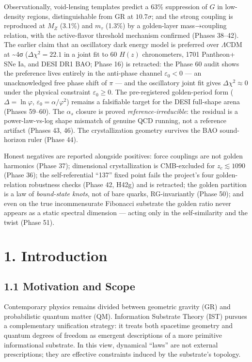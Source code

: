 \documentclass[
  11pt,
]{article}
\begin{document}
Observationally, void-lensing templates predict a 63\% suppression of
\(G\) in low-density regions, distinguishable from GR at \(10.7\sigma\);
and the strong coupling is reproduced at \(M_Z\) (3.1\%) and \(m_\tau\)
(1.3\%) by a golden-layer mass→coupling relation, with the active-flavor
threshold mechanism confirmed (Phases 38--42). The earlier claim that an
oscillatory dark energy model is preferred over \(\Lambda\)CDM at
\textasciitilde4σ (\(\Delta\chi^2 = 22.1\) in a joint fit to 60 \(H(z)\)
chronometers, 1701 Pantheon+ SNe Ia, and DESI DR1 BAO; Phase 16) is
retracted: the Phase 60 audit shows the preference lives entirely in the
anti-phase channel \(\varepsilon_0 < 0\) --- an unacknowledged free
phase shift of \(\pi\) --- and the oscillatory joint fit gives
\(\Delta\chi^2 \approx 0\) under the physical constraint
\(\varepsilon_0 \geq 0\). The pre-registered golden-period form
(\(\Delta = \ln\varphi\), \(\varepsilon_0 = \alpha/\varphi^2\)) remains
a falsifiable target for the DESI full-shape arena (Phases 59--60). The
\(\alpha_s\) closure is proved \emph{reference-irreducible}: the
residual is a power-law-vs-log shape mismatch of genuine QCD running,
not a reference artifact (Phases 43, 46). The crystallization geometry
survives the BAO sound-horizon ruler (Phase 44).

Honest negatives are reported alongside positives: force couplings are
not golden harmonics (Phase 37); dimensional crystallization is
CMB-excluded for \(z_c \lesssim 1090\) (Phase 36); the self-referential
``137'' fixed point fails the project's four golden-relation robustness
checks (Phase 42, H42g) and is retracted; the golden partition is a law
of \emph{bound-state knots}, not of bare quarks, RG-invariantly (Phase
50); and even on the true incommensurate Fibonacci substrate the golden
ratio never appears as a static spectral dimension --- acting only in
the self-similarity and the twist (Phase 51).

\section{1. Introduction}\label{introduction}

\subsection{1.1 Motivation and Scope}\label{motivation-and-scope}

Contemporary physics remains divided between geometric gravity (GR) and
probabilistic quantum matter (QM). Information Substrate Theory (IST)
pursues a complementary unification strategy: it treats both spacetime
geometry and quantum degrees of freedom as emergent descriptions of a
more primitive informational substrate. In this view, dynamical ``laws''
are not external prescriptions; they are effective constraints induced
by the substrate's topology.
\end{document}
